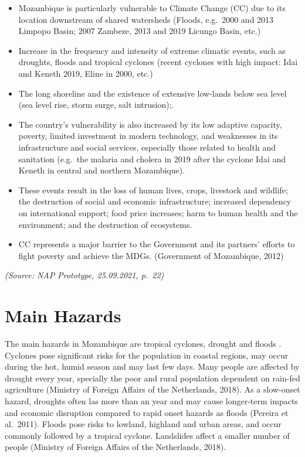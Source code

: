 \documentclass[
]{book}
\begin{document}
\begin{itemize}
\item
  Mozambique is particularly vulnerable to Climate Change (CC) due to its location downstream of shared watersheds (Floods, e.g.~2000 and 2013 Limpopo Basin; 2007 Zambeze, 2013 and 2019 Licungo Basin, etc.)
\item
  Increase in the frequency and intensity of extreme climatic events, such as droughts, floods and tropical cyclones (recent cyclones with high impact: Idai and Keneth 2019, Eline in 2000, etc.)
\item
  The long shoreline and the existence of extensive low-lands below sea level (sea level rise, storm surge, salt intrusion);.
\item
  The country's vulnerability is also increased by its low adaptive capacity, poverty, limited investment in modern technology, and weaknesses in its infrastructure and social services, especially those related to health and sanitation (e.g.~the malaria and cholera in 2019 after the cyclone Idai and Keneth in central and northern Mozambique).
\item
  These events result in the loss of human lives, crops, livestock and wildlife; the destruction of social and economic infrastructure; increased dependency on international support; food price increases; harm to human health and the environment; and the destruction of ecosystems.
\item
  CC represents a major barrier to the Government and its partners' efforts to fight poverty and achieve the MDGs.
  (Government of Mozambique, 2012)
\end{itemize}

\emph{(Source: NAP Prototype, 25.09.2021, p.~22)}

\hypertarget{main-hazards}{%
\section{Main Hazards}\label{main-hazards}}

The main hazards in Mozambique are tropical cyclones, drought and floods . Cyclones pose significant risks for the population in coastal regions, may occur during the hot, humid season and may last few days. Many people are affected by drought every year, specially the poor and rural population dependent on rain-fed agriculture (Ministry of Foreign Affairs of the Netherlands, 2018). As a slow-onset hazard, droughts often las more than an year and may cause longer-term impacts and economic disruption compared to rapid onset hazards as floods (Pereira et al.~2011). Floods pose risks to lowland, highland and urban areas, and occur commonly followed by a tropical cyclone. Landslides affect a smaller number of people (Ministry of Foreign Affairs of the Netherlands, 2018).
\end{document}
